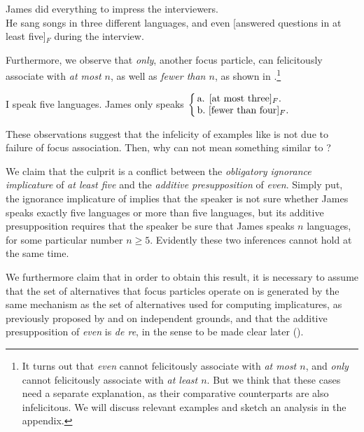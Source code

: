 \documentclass[output=paper]{langscibook}
\begin{document}
    \ea James did everything to impress the interviewers.\\He sang songs in three different languages, and even [answered questions in at least five]$_F$ during the interview.\label{don-sud:broad}
    \z

\noindent Furthermore, we observe that \textit{only}, another focus particle, can felicitously associate with \textit{at most $n$}, as well as \textit{fewer than $n$}, as shown in .\footnote{It turns out that \textit{even} cannot felicitously associate with \textit{at most $n$}, and \textit{only} cannot felicitously associate with \textit{at least $n$}. But we think that these cases need a separate explanation, as their comparative counterparts are also infelicitous. We will discuss relevant examples and sketch an analysis in the appendix.\label{don-sud:fn:appendix}}

    \ea I speak five languages. James only speaks $\left\{\begin{array}{@{\,}l@{}}\text{a. {[at most three]$_F$}.}\\\text{b.\ {[fewer than four]$_F$}.}\end{array}\right.$
    \label{don-sud:onlyde}
    \z

\noindent These observations suggest that the infelicity of examples like  is not due to failure of focus association. Then, why can  not mean something similar to ?\largerpage

We claim that the culprit is a conflict between the \textit{obligatory ignorance implicature} of \textit{at least five} and the \textit{additive presupposition} of \textit{even}. Simply put, the ignorance implicature of  implies that the speaker is not sure whether James speaks exactly five languages or more than five languages, but its additive presupposition requires that the speaker be sure that James speaks $n$ languages, for some particular number $n\geq 5$. Evidently these two inferences cannot hold at the same time.

We furthermore claim that in order to obtain this result, it is necessary to assume that the set of alternatives that focus particles operate on is generated by the same mechanism as the set of alternatives used for computing implicatures, as previously proposed by \citet{rooth:92} and \citet{foxkatzir} on independent grounds, and that the additive presupposition of \textit{even} is \textit{de re}, in the sense to be made clear later (\citealt{kripke}).
\end{document}
